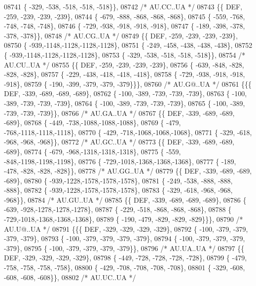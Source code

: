 \begin{DoxyCode}
08741 \{ -329, -538, -518, -518, -518\}\},
08742 \textcolor{comment}{/* AU.CC..UA */}
08743 \{\{  DEF, -259, -239, -239, -239\},
08744 \{ -679, -888, -868, -868, -868\},
08745 \{ -559, -768, -748, -748, -748\},
08746 \{ -729, -938, -918, -918, -918\},
08747 \{ -189, -398, -378, -378, -378\}\},
08748 \textcolor{comment}{/* AU.CG..UA */}
08749 \{\{  DEF, -259, -239, -239, -239\},
08750 \{ -939,-1148,-1128,-1128,-1128\},
08751 \{ -249, -458, -438, -438, -438\},
08752 \{ -939,-1148,-1128,-1128,-1128\},
08753 \{ -329, -538, -518, -518, -518\}\},
08754 \textcolor{comment}{/* AU.CU..UA */}
08755 \{\{  DEF, -259, -239, -239, -239\},
08756 \{ -639, -848, -828, -828, -828\},
08757 \{ -229, -438, -418, -418, -418\},
08758 \{ -729, -938, -918, -918, -918\},
08759 \{ -190, -399, -379, -379, -379\}\}\},
08760 \textcolor{comment}{/* AU.G@..UA */}
08761 \{\{\{  DEF, -339, -689, -689, -689\},
08762 \{ -100, -389, -739, -739, -739\},
08763 \{ -100, -389, -739, -739, -739\},
08764 \{ -100, -389, -739, -739, -739\},
08765 \{ -100, -389, -739, -739, -739\}\},
08766 \textcolor{comment}{/* AU.GA..UA */}
08767 \{\{  DEF, -339, -689, -689, -689\},
08768 \{ -449, -738,-1088,-1088,-1088\},
08769 \{ -479, -768,-1118,-1118,-1118\},
08770 \{ -429, -718,-1068,-1068,-1068\},
08771 \{ -329, -618, -968, -968, -968\}\},
08772 \textcolor{comment}{/* AU.GC..UA */}
08773 \{\{  DEF, -339, -689, -689, -689\},
08774 \{ -679, -968,-1318,-1318,-1318\},
08775 \{ -559, -848,-1198,-1198,-1198\},
08776 \{ -729,-1018,-1368,-1368,-1368\},
08777 \{ -189, -478, -828, -828, -828\}\},
08778 \textcolor{comment}{/* AU.GG..UA */}
08779 \{\{  DEF, -339, -689, -689, -689\},
08780 \{ -939,-1228,-1578,-1578,-1578\},
08781 \{ -249, -538, -888, -888, -888\},
08782 \{ -939,-1228,-1578,-1578,-1578\},
08783 \{ -329, -618, -968, -968, -968\}\},
08784 \textcolor{comment}{/* AU.GU..UA */}
08785 \{\{  DEF, -339, -689, -689, -689\},
08786 \{ -639, -928,-1278,-1278,-1278\},
08787 \{ -229, -518, -868, -868, -868\},
08788 \{ -729,-1018,-1368,-1368,-1368\},
08789 \{ -190, -479, -829, -829, -829\}\}\},
08790 \textcolor{comment}{/* AU.U@..UA */}
08791 \{\{\{  DEF, -329, -329, -329, -329\},
08792 \{ -100, -379, -379, -379, -379\},
08793 \{ -100, -379, -379, -379, -379\},
08794 \{ -100, -379, -379, -379, -379\},
08795 \{ -100, -379, -379, -379, -379\}\},
08796 \textcolor{comment}{/* AU.UA..UA */}
08797 \{\{  DEF, -329, -329, -329, -329\},
08798 \{ -449, -728, -728, -728, -728\},
08799 \{ -479, -758, -758, -758, -758\},
08800 \{ -429, -708, -708, -708, -708\},
08801 \{ -329, -608, -608, -608, -608\}\},
08802 \textcolor{comment}{/* AU.UC..UA */}

\end{DoxyCode}

